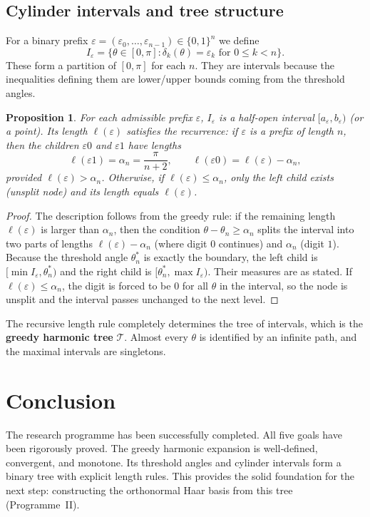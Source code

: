 \documentclass[11pt,a4paper]{article}
\newtheorem{proposition}[theorem]{Proposition}
\begin{document}
\subsection{Cylinder intervals and tree structure}

For a binary prefix \(\varepsilon = (\varepsilon_0,\dots,\varepsilon_{n-1})\in\{0,1\}^n\) we define
\[
I_\varepsilon = \{\theta\in[0,\pi] : \delta_k(\theta)=\varepsilon_k\text{ for }0\le k<n\}.
\]
These form a partition of \([0,\pi]\) for each \(n\).  They are intervals because the inequalities defining them are lower/upper bounds coming from the threshold angles.

\begin{proposition}\label{prop:intervals}
For each admissible prefix \(\varepsilon\), \(I_\varepsilon\) is a half‑open interval \([a_\varepsilon,b_\varepsilon)\) (or a point).  Its length \(\ell(\varepsilon)\) satisfies the recurrence: if \(\varepsilon\) is a prefix of length \(n\), then the children \(\varepsilon0\) and \(\varepsilon1\) have lengths
\[
\ell(\varepsilon1) = \alpha_n = \frac{\pi}{n+2},\qquad
\ell(\varepsilon0) = \ell(\varepsilon) - \alpha_n,
\]
provided \(\ell(\varepsilon) > \alpha_n\).  Otherwise, if \(\ell(\varepsilon) \le \alpha_n\), only the left child exists (unsplit node) and its length equals \(\ell(\varepsilon)\).
\end{proposition}

\begin{proof}
The description follows from the greedy rule: if the remaining length \(\ell(\varepsilon)\) is larger than \(\alpha_n\), then the condition \(\theta-\theta_n\ge\alpha_n\) splits the interval into two parts of lengths \(\ell(\varepsilon)-\alpha_n\) (where digit \(0\) continues) and \(\alpha_n\) (digit \(1\)).  Because the threshold angle \(\theta_n^*\) is exactly the boundary, the left child is \([\min I_\varepsilon, \theta_n^*)\) and the right child is \([\theta_n^*, \max I_\varepsilon)\).  Their measures are as stated.  If \(\ell(\varepsilon)\le\alpha_n\), the digit is forced to be \(0\) for all \(\theta\) in the interval, so the node is unsplit and the interval passes unchanged to the next level.
\end{proof}

The recursive length rule completely determines the tree of intervals, which is the \textbf{greedy harmonic tree} \(\mathcal{T}\).  Almost every \(\theta\) is identified by an infinite path, and the maximal intervals are singletons.

\section{Conclusion}
The research programme has been successfully completed.  All five goals have been rigorously proved.  The greedy harmonic expansion is well‑defined, convergent, and monotone.  Its threshold angles and cylinder intervals form a binary tree with explicit length rules.  This provides the solid foundation for the next step: constructing the orthonormal Haar basis from this tree (Programme~II).
\end{document}
